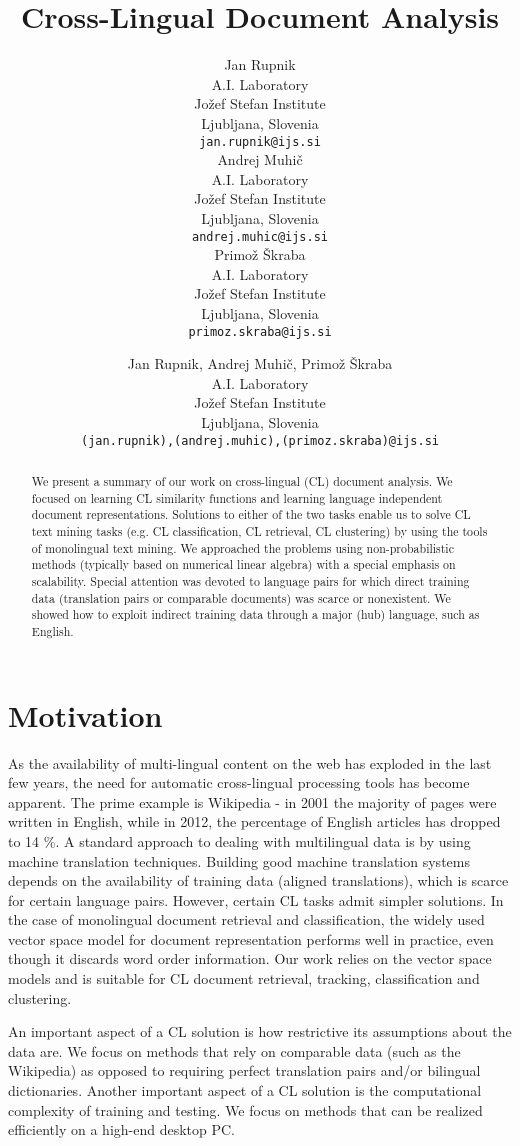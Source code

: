 \documentclass{article} %
\title{Cross-Lingual Document Analysis}
\author{
Jan Rupnik \\
A.I. Laboratory\\
Jo\v zef Stefan Institute\\
Ljubljana, Slovenia\\
\texttt{jan.rupnik@ijs.si} \\
\And
Andrej Muhi\v c\\
A.I. Laboratory\\
Jo\v zef Stefan Institute\\
Ljubljana, Slovenia\\
\texttt{andrej.muhic@ijs.si} \\
\AND
Primo\v z \v Skraba \\
A.I. Laboratory\\
Jo\v zef Stefan Institute\\
Ljubljana, Slovenia\\
\texttt{primoz.skraba@ijs.si} \\
}
\author{
Jan Rupnik, Andrej Muhi\v c, Primo\v z \v Skraba \\
A.I. Laboratory\\
Jo\v zef Stefan Institute\\
Ljubljana, Slovenia\\
\texttt{(jan.rupnik),(andrej.muhic),(primoz.skraba)@ijs.si} \\
}
\begin{document}
\maketitle

\begin{abstract}
We present a summary of our work on cross-lingual (CL) document analysis. We focused on learning CL similarity functions and learning language independent document representations. Solutions to either of the two tasks enable us to solve CL text mining tasks (e.g. CL classification, CL retrieval, CL clustering) by using the tools of monolingual text mining. We approached the problems using non-probabilistic methods (typically based on numerical linear algebra) with a special emphasis on scalability. Special attention was devoted to language pairs for which direct training data (translation pairs or comparable documents) was scarce or nonexistent. We showed how to exploit indirect training data through a major (hub) language, such as English.


\end{abstract}


\section{Motivation}
As the availability of multi-lingual content on the web has exploded in the last few years, the need for automatic cross-lingual processing tools has become apparent. The prime example is Wikipedia - in 2001 the majority of pages were written in English, while in 2012, the percentage of English articles has dropped to 14 \%. A standard approach to dealing with multilingual data is by using machine translation techniques. Building good machine translation systems depends on the availability of training data (aligned translations), which is scarce for certain language pairs. However, certain CL tasks admit simpler solutions. In the case of monolingual document retrieval and classification, the widely used vector space model for document representation performs well in practice, even though it discards word order information. Our work relies on the vector space models and is suitable for CL document retrieval, tracking, classification and clustering.

An important aspect of a CL solution is how restrictive its assumptions about the data are. We focus on methods that rely on comparable data (such as the Wikipedia) as opposed to requiring perfect translation pairs and/or bilingual dictionaries. Another important aspect of a CL solution is the computational complexity of training and testing. We focus on methods that can be realized efficiently on a high-end desktop PC.
\end{document}
